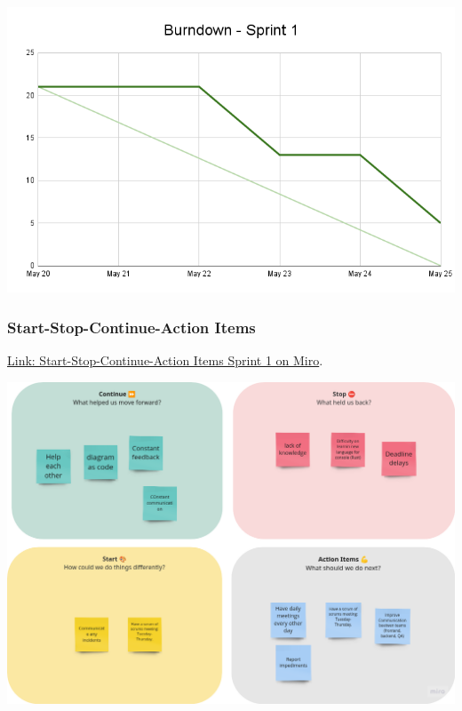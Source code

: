 \includegraphics[width=\textwidth]{./artifacts/src/sprint-1/assets/Burndown-Sprint1.png}

\hypertarget{startstopcontinueactionitems-s1}{
\subsubsection{Start-Stop-Continue-Action Items}\label{Start-Stop-Continue-Action Items S1}}
\href{https://miro.com/app/board/uXjVKDO7l8M=/?moveToWidget=3458764590247693119&cot=14}{Link: Start-Stop-Continue-Action Items Sprint 1 on Miro}.

\includegraphics[width=\textwidth]{./artifacts/src/sprint-1/assets/retrospective-s1.png}
